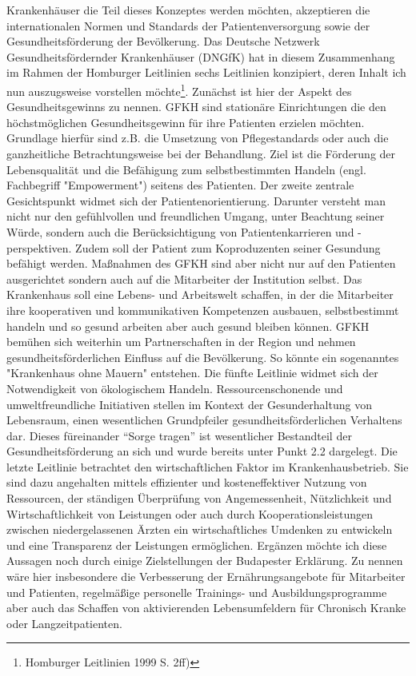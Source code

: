 Krankenhäuser die Teil dieses Konzeptes werden möchten, akzeptieren die internationalen Normen und Standards der Patientenversorgung sowie der Gesundheitsförderung der Bevölkerung. Das Deutsche Netzwerk Gesundheitsfördernder Krankenhäuser (DNGfK) hat in diesem Zusammenhang im Rahmen der Homburger Leitlinien sechs Leitlinien konzipiert, deren Inhalt ich nun auszugsweise vorstellen möchte\footnote{Homburger Leitlinien 1999 S. 2ff)}. Zunächst ist hier der Aspekt des Gesundheitsgewinns zu nennen. GFKH sind stationäre Einrichtungen die den höchstmöglichen Gesundheitsgewinn für ihre Patienten erzielen möchten. Grundlage hierfür sind z.B. die Umsetzung von Pflegestandards oder auch die ganzheitliche Betrachtungsweise bei der Behandlung. Ziel ist die Förderung der Lebensqualität und die Befähigung zum selbstbestimmten Handeln (engl. Fachbegriff "Empowerment") seitens des Patienten. Der zweite zentrale Gesichtspunkt widmet sich der Patientenorientierung. Darunter versteht man nicht nur den gefühlvollen und freundlichen Umgang, unter Beachtung seiner Würde, sondern auch die Berücksichtigung von Patientenkarrieren und -perspektiven. Zudem soll der Patient zum Koproduzenten seiner Gesundung befähigt werden. Maßnahmen des GFKH sind aber nicht nur auf den Patienten ausgerichtet sondern auch auf die Mitarbeiter der Institution selbst. Das Krankenhaus soll eine Lebens- und Arbeitswelt schaffen, in der die Mitarbeiter ihre kooperativen und kommunikativen Kompetenzen ausbauen, selbstbestimmt handeln und so gesund arbeiten aber auch gesund bleiben können. GFKH bemühen sich weiterhin um Partnerschaften in der Region und nehmen gesundheitsförderlichen Einfluss auf die Bevölkerung. So könnte ein sogenanntes "Krankenhaus ohne Mauern" entstehen. Die fünfte Leitlinie widmet sich der Notwendigkeit von ökologischem Handeln. Ressourcenschonende und umweltfreundliche Initiativen stellen im Kontext der Gesunderhaltung von Lebensraum, einen wesentlichen Grundpfeiler gesundheitsförderlichen Verhaltens dar. Dieses füreinander "`Sorge tragen"' ist wesentlicher Bestandteil der Gesundheitsförderung an sich und wurde bereits unter Punkt 2.2 dargelegt. Die letzte Leitlinie betrachtet den wirtschaftlichen Faktor im Krankenhausbetrieb. Sie sind dazu angehalten mittels effizienter und kosteneffektiver Nutzung von Ressourcen, der ständigen Überprüfung von Angemessenheit, Nützlichkeit und Wirtschaftlichkeit von Leistungen oder auch durch Kooperationsleistungen zwischen niedergelassenen Ärzten ein wirtschaftliches Umdenken zu entwickeln und eine Transparenz der Leistungen ermöglichen.
Ergänzen möchte ich diese Aussagen noch durch einige Zielstellungen der Budapester Erklärung. Zu nennen wäre hier insbesondere die Verbesserung der Ernährungsangebote für Mitarbeiter und Patienten, regelmäßige personelle Trainings- und Ausbildungsprogramme aber auch das Schaffen von aktivierenden Lebensumfeldern für Chronisch Kranke oder Langzeitpatienten.

